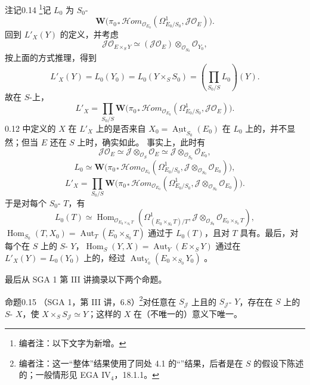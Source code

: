 \begin{SGAresult}{注记}{0.14}
\footnote{编者注：以下文字为新增。}记 $L_0$ 为 $S_0$-
\[\mathbf W\bigl(\pi_{0*}\mathcal Hom_{\mathcal O_{E_0}}(\Omega^1_{E_0/S_0},\mathcal J\mathcal O_E)\bigr).\]
回到 $L'_X(Y)$ 的定义，并考虑
\[\mathcal J\mathcal O_{E\times_S Y}\simeq(\mathcal J\mathcal O_E)\otimes_{\mathcal O_{S_0}}\mathcal O_{Y_0},\]
按上面的方式推理，得到
\[L'_X(Y)=L_0(Y_0)=L_0(Y\times_S S_0)=\left(\prod_{S_0/S}L_0\right)(Y).\]
故在 $S$-上，
\[L'_X=\prod_{S_0/S}\mathbf W\bigl(\pi_{0*}\mathcal Hom_{\mathcal O_{E_0}}(\Omega^1_{E_0/S_0},\mathcal J\mathcal O_E)\bigr).\]
0.12 中定义的 $X$ 在 $L'_X$ 上的是否来自 $X_0=\underline{\operatorname{Aut}}_{S_0}(E_0)$ 在 $L_0$ 上的，并不显然；但当 $E$ 还在 $S$ 上时，确实如此。
事实上，此时有
\[\mathcal J\mathcal O_E\simeq\mathcal J\otimes_{\mathcal O_S}\mathcal O_E\simeq\mathcal J\otimes_{\mathcal O_{S_0}}\mathcal O_{E_0},\]
\[L_0\simeq\mathbf W\bigl(\pi_{0*}\mathcal Hom_{\mathcal O_{E_0}}(\Omega^1_{E_0/S_0},\mathcal J\otimes_{\mathcal O_{S_0}}\mathcal O_{E_0})\bigr),\]
\[L'_X=\prod_{S_0/S}\mathbf W\bigl(\pi_{0*}\mathcal Hom_{\mathcal O_{E_0}}(\Omega^1_{E_0/S_0},\mathcal J\otimes_{\mathcal O_{S_0}}\mathcal O_{E_0})\bigr).\tag{0.14.2}\]
于是对每个 $S_0$- $T$，有
\[L_0(T)\simeq\operatorname{Hom}_{\mathcal O_{E_0\times_{S_0}T}}(\Omega^1_{(E_0\times_{S_0}T)/T},\mathcal J\otimes_{\mathcal O_{S_0}}\mathcal O_{E_0\times_{S_0}T}),\]
$\operatorname{Hom}_{S_0}(T,X_0)=\operatorname{Aut}_T(E_0\times_{S_0}T)$ 通过于 $L_0(T)$，且对 $T$ 具有。最后，对每个在 $S$ 上的 $S$- $Y$，$\operatorname{Hom}_S(Y,X)=\operatorname{Aut}_Y(E\times_S Y)$ 通过在 $L'_X(Y)=L_0(Y_0)$ 上的，经过 $\operatorname{Aut}_{Y_0}(E_0\times_{S_0}Y_0)$ 。
\end{SGAresult}
最后从 SGA 1 第 III 讲摘录以下两个命题。
\begin{SGAresult}{命题}{0.15}
（SGA 1，第 III 讲，6.8）\footnote{编者注：这一“整体”结果使用了同处 4.1 的“”结果，后者是在 $S$  的假设下陈述的；一般情形见 EGA IV$_4$，18.1.1。}对任意在 $S_{\mathcal J}$ 上且的 $S_{\mathcal J}$- $Y$，存在在 $S$ 上的 $S$- $X$，使 $X\times_S S_{\mathcal J}\simeq Y$；这样的 $X$ 在（不唯一的）意义下唯一。
\end{SGAresult}
